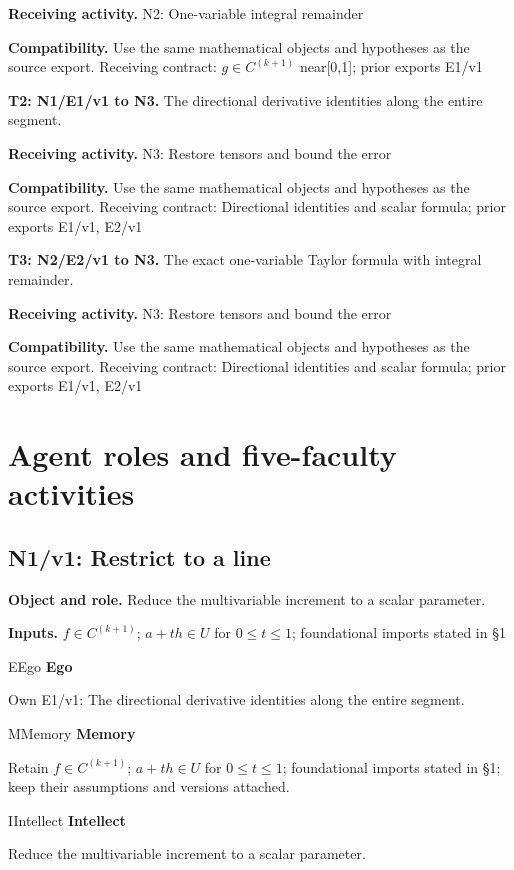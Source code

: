 \documentclass[preprint,12pt,aps,pra,showkeys,amsmath,amssymb,superscriptaddress,floatfix]{revtex4-2}
\theoremstyle{definition}
\theoremstyle{remark}
\newcommand{\mmfaculty}[3]{%
 \begin{mmfacultybox}{#1}{#2}
 {\sffamily\bfseries\color{MMBlue}#2}\par\smallskip #3
 \end{mmfacultybox}}
\newcommand{\field}[2]{\par\smallskip\noindent\textbf{#1.} #2\par}
\begin{document}
\field{Receiving activity}{N2: One-variable integral remainder}

\field{Compatibility}{Use the same mathematical objects and hypotheses as the source export.
Receiving contract: \(g\in C^{(k+1)}\) near{[}0,1{]}; prior exports
E1/v1}

\field{T2: N1/E1/v1 to N3}{The directional derivative identities along the entire segment.}

\field{Receiving activity}{N3: Restore tensors and bound the error}

\field{Compatibility}{Use the same mathematical objects and hypotheses as the source export.
Receiving contract: Directional identities and scalar formula; prior
exports E1/v1, E2/v1}

\field{T3: N2/E2/v1 to N3}{The exact one-variable Taylor formula with integral remainder.}

\field{Receiving activity}{N3: Restore tensors and bound the error}

\field{Compatibility}{Use the same mathematical objects and hypotheses as the source export.
Receiving contract: Directional identities and scalar formula; prior
exports E1/v1, E2/v1}

\endgroup

\clearpage\section{Agent roles and five-faculty activities}\begingroup\small\linespread{1.05}\selectfont{}

\subsection{N1/v1: Restrict to a line}

\field{Object and role}{Reduce the multivariable increment to a scalar parameter.}

\field{Inputs}{\(f\in C^{(k+1)}\); \(a+th\in U\) for \(0\le t\le 1\); foundational
imports stated in §1}

\mmfaculty{E}{Ego}{Own E1/v1: The directional derivative identities along the entire
segment.}

\mmfaculty{M}{Memory}{Retain \(f\in C^{(k+1)}\); \(a+th\in U\) for \(0\le t\le 1\);
foundational imports stated in §1; keep their assumptions and versions
attached.}

\mmfaculty{I}{Intellect}{Reduce the multivariable increment to a scalar parameter.}
\end{document}
